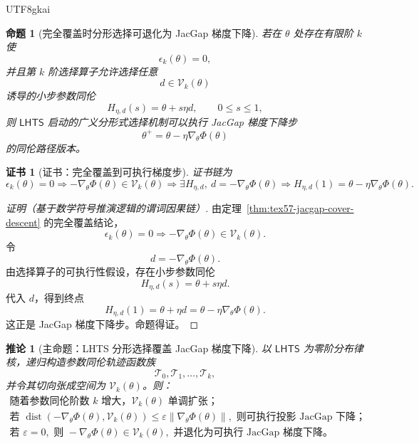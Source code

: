\documentclass[12pt]{article}
\newtheorem{proposition}{命题}[section]
\newtheorem{corollary}{推论}[section]
\newtheorem{Certificate}{证书}[section]
\newcommand{\LHTS}{\ensuremath{\mathsf{LHTS}}}
\DeclareMathOperator{\dist}{dist}
\begin{document}
\begin{CJK*}{UTF8}{gkai}
\begin{proposition}[完全覆盖时分形选择可退化为 JacGap 梯度下降]
\label{prop:tex57-fractal-selection-gradient-descent}
若在 \(\theta\) 处存在有限阶 \(k\) 使
\[
  \epsilon_k(\theta)=0,
\]
并且第 \(k\) 阶选择算子允许选择任意
\[
  d\in\mathcal V_k(\theta)
\]
诱导的小步参数同伦
\[
  H_{\eta,d}(s)=\theta+s\eta d,
  \qquad
  0\le s\le1,
\]
则 \(\LHTS{}\) 启动的广义分形式选择机制可以执行 JacGap 梯度下降步
\[
  \theta^+
  =
  \theta-\eta\nabla_\theta\Phi(\theta)
\]
的同伦路径版本。
\end{proposition}

\begin{Certificate}[证书：完全覆盖到可执行梯度步]
\label{cert:tex57-fractal-selection-gradient-descent}
证书链为
\[
  \epsilon_k(\theta)=0
  \Longrightarrow
  -\nabla_\theta\Phi(\theta)\in\mathcal V_k(\theta)
  \Longrightarrow
  \exists H_{\eta,d},\ d=-\nabla_\theta\Phi(\theta)
  \Longrightarrow
  H_{\eta,d}(1)=\theta-\eta\nabla_\theta\Phi(\theta).
\]
\end{Certificate}

\begin{proof}[证明（基于数学符号推演逻辑的谓词因果链）]
由定理~\ref{thm:tex57-jacgap-cover-descent} 的完全覆盖结论，
\[
  \epsilon_k(\theta)=0
  \Longrightarrow
  -\nabla_\theta\Phi(\theta)\in\mathcal V_k(\theta).
\]
令
\[
  d=-\nabla_\theta\Phi(\theta).
\]
由选择算子的可执行性假设，存在小步参数同伦
\[
  H_{\eta,d}(s)=\theta+s\eta d.
\]
代入 \(d\)，得到终点
\[
  H_{\eta,d}(1)
  =
  \theta+\eta d
  =
  \theta-\eta\nabla_\theta\Phi(\theta).
\]
这正是 JacGap 梯度下降步。命题得证。
\end{proof}

\begin{corollary}[主命题：LHTS 分形选择覆盖 JacGap 梯度下降]
\label{cor:tex57-main-compressed-proposition}
以 \(\LHTS{}\) 为零阶分布律核，递归构造参数同伦轨迹函数族
\[
  \mathcal T_0,\mathcal T_1,\ldots,\mathcal T_k,
\]
并令其切向张成空间为 \(\mathcal V_k(\theta)\)。则：
\[
\boxed{
\begin{gathered}
\text{随着参数同伦阶数 }k\text{ 增大，}
\mathcal V_k(\theta)\text{ 单调扩张；}\\
\text{若 }
\dist(-\nabla_\theta\Phi(\theta),\mathcal V_k(\theta))
\le
\varepsilon\|\nabla_\theta\Phi(\theta)\|,
\text{ 则可执行投影 JacGap 下降；}\\
\text{若 }\varepsilon=0,
\text{ 则 }
-\nabla_\theta\Phi(\theta)\in\mathcal V_k(\theta),
\text{ 并退化为可执行 JacGap 梯度下降。}
\end{gathered}
}
\]
\end{corollary}


\end{CJK*}
\end{document}
